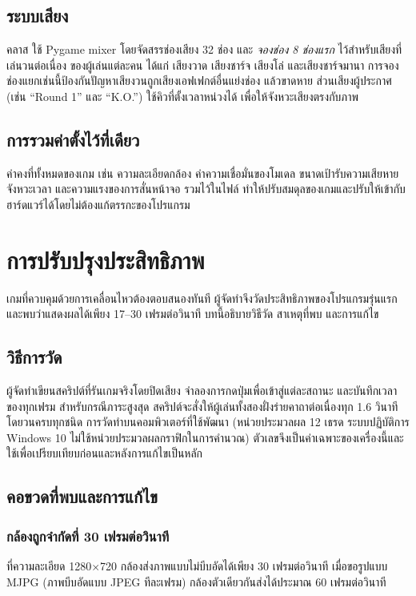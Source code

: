 \documentclass[12pt,a4paper]{report}
\newcommand{\code}[1]{\texttt{\detokenize{#1}}}
\begin{document}
\section{ระบบเสียง}
คลาส \code{SoundManager} ใช้ Pygame mixer โดยจัดสรรช่องเสียง 32 ช่อง และ \textit{จองช่อง 8 ช่องแรก} ไว้สำหรับเสียงที่เล่นวนต่อเนื่อง
ของผู้เล่นแต่ละคน ได้แก่ เสียงวาด เสียงชาร์จ เสียงโล่ และเสียงชาร์จมานา การจองช่องแยกเช่นนี้ป้องกันปัญหาเสียงวนถูกเสียงเอฟเฟกต์อื่นแย่งช่อง
แล้วขาดหาย ส่วนเสียงผู้ประกาศ (เช่น ``Round 1'' และ ``K.O.'') ใช้คิวที่ตั้งเวลาหน่วงได้ เพื่อให้จังหวะเสียงตรงกับภาพ

\section{การรวมค่าตั้งไว้ที่เดียว}
ค่าคงที่ทั้งหมดของเกม เช่น ความละเอียดกล้อง ค่าความเชื่อมั่นของโมเดล ขนาดเป้ารับความเสียหาย จังหวะเวลา และความแรงของการสั่นหน้าจอ
รวมไว้ในไฟล์ \code{config.py} ทำให้ปรับสมดุลของเกมและปรับให้เข้ากับฮาร์ดแวร์ได้โดยไม่ต้องแก้ตรรกะของโปรแกรม

\chapter{การปรับปรุงประสิทธิภาพ}

เกมที่ควบคุมด้วยการเคลื่อนไหวต้องตอบสนองทันที ผู้จัดทำจึงวัดประสิทธิภาพของโปรแกรมรุ่นแรกและพบว่าแสดงผลได้เพียง
17--30 เฟรมต่อวินาที บทนี้อธิบายวิธีวัด สาเหตุที่พบ และการแก้ไข

\section{วิธีการวัด}
ผู้จัดทำเขียนสคริปต์ที่รันเกมจริงโดยปิดเสียง จำลองการกดปุ่มเพื่อเข้าสู่แต่ละสถานะ และบันทึกเวลาของทุกเฟรม
สำหรับกรณีภาระสูงสุด สคริปต์จะสั่งให้ผู้เล่นทั้งสองฝั่งร่ายคาถาต่อเนื่องทุก 1.6 วินาทีโดยวนครบทุกชนิด
การวัดทำบนคอมพิวเตอร์ที่ใช้พัฒนา (หน่วยประมวลผล 12 เธรด ระบบปฏิบัติการ Windows 10 ไม่ใช้หน่วยประมวลผลกราฟิกในการคำนวณ)
ตัวเลขจึงเป็นค่าเฉพาะของเครื่องนี้และใช้เพื่อเปรียบเทียบก่อนและหลังการแก้ไขเป็นหลัก

\section{คอขวดที่พบและการแก้ไข}

\subsection{กล้องถูกจำกัดที่ 30 เฟรมต่อวินาที}
ที่ความละเอียด 1280$\times$720 กล้องส่งภาพแบบไม่บีบอัดได้เพียง 30 เฟรมต่อวินาที เมื่อขอรูปแบบ MJPG
(ภาพบีบอัดแบบ JPEG ทีละเฟรม) กล้องตัวเดียวกันส่งได้ประมาณ 60 เฟรมต่อวินาที
\end{document}
